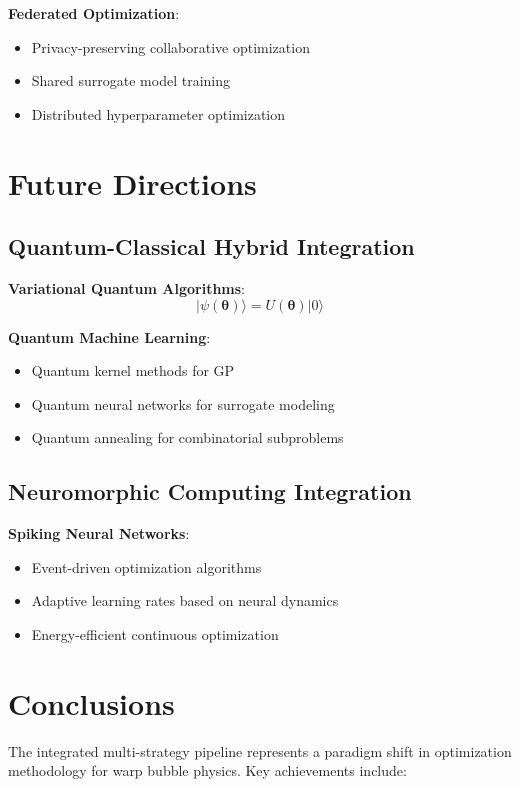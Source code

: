 \documentclass[11pt,a4paper]{article}
\begin{document}
\textbf{Federated Optimization}:
\begin{itemize}
\item Privacy-preserving collaborative optimization
\item Shared surrogate model training
\item Distributed hyperparameter optimization
\end{itemize}

\section{Future Directions}

\subsection{Quantum-Classical Hybrid Integration}

\textbf{Variational Quantum Algorithms}:
\begin{equation}
|\psi(\boldsymbol{\theta})\rangle = U(\boldsymbol{\theta}) |0\rangle
\end{equation}

\textbf{Quantum Machine Learning}:
\begin{itemize}
\item Quantum kernel methods for GP
\item Quantum neural networks for surrogate modeling
\item Quantum annealing for combinatorial subproblems
\end{itemize}

\subsection{Neuromorphic Computing Integration}

\textbf{Spiking Neural Networks}:
\begin{itemize}
\item Event-driven optimization algorithms
\item Adaptive learning rates based on neural dynamics
\item Energy-efficient continuous optimization
\end{itemize}

\section{Conclusions}

The integrated multi-strategy pipeline represents a paradigm shift in optimization methodology for warp bubble physics. Key achievements include:
\end{document}

